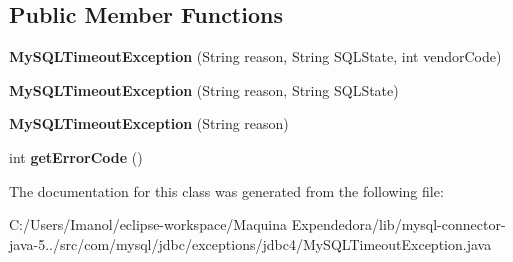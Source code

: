 \subsection*{Public Member Functions}
\begin{DoxyCompactItemize}
\item 
\mbox{\label{classcom_1_1mysql_1_1jdbc_1_1exceptions_1_1jdbc4_1_1_my_s_q_l_timeout_exception_a8268e8538d50ac9a5ac4dd619deaaee3}} 
{\bfseries My\+S\+Q\+L\+Timeout\+Exception} (String reason, String S\+Q\+L\+State, int vendor\+Code)
\item 
\mbox{\label{classcom_1_1mysql_1_1jdbc_1_1exceptions_1_1jdbc4_1_1_my_s_q_l_timeout_exception_a8da500eaf783edb6c70b1e868e53b0ed}} 
{\bfseries My\+S\+Q\+L\+Timeout\+Exception} (String reason, String S\+Q\+L\+State)
\item 
\mbox{\label{classcom_1_1mysql_1_1jdbc_1_1exceptions_1_1jdbc4_1_1_my_s_q_l_timeout_exception_a5bc2b2dd7e92b26e7ca1b2e8bec9917e}} 
{\bfseries My\+S\+Q\+L\+Timeout\+Exception} (String reason)
\item 
\mbox{\label{classcom_1_1mysql_1_1jdbc_1_1exceptions_1_1jdbc4_1_1_my_s_q_l_timeout_exception_a5904fe1cc4f4b75dafac16ec2d6a46b7}} 
int {\bfseries get\+Error\+Code} ()
\end{DoxyCompactItemize}


The documentation for this class was generated from the following file\+:\begin{DoxyCompactItemize}
\item 
C\+:/\+Users/\+Imanol/eclipse-\/workspace/\+Maquina Expendedora/lib/mysql-\/connector-\/java-\/5../src/com/mysql/jdbc/exceptions/jdbc4/My\+S\+Q\+L\+Timeout\+Exception.\+java\end{DoxyCompactItemize}
